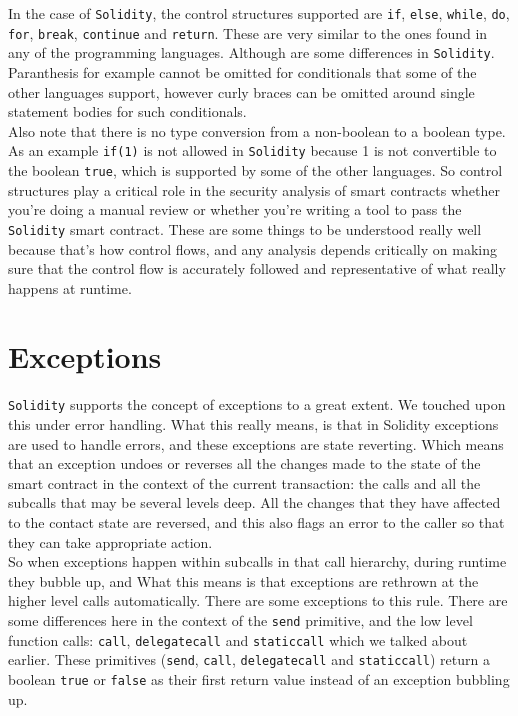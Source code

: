 In the case of \texttt{Solidity}, the control structures supported are \texttt{if}, \texttt{else}, \texttt{while}, \texttt{do}, \texttt{for}, \texttt{break}, \texttt{continue} and \texttt{return}. These are very similar to the ones found in any of the programming languages. Although  are some differences in \texttt{Solidity}. Paranthesis for example cannot be omitted for conditionals that some of the other languages support, however curly braces can be omitted around single statement bodies for such conditionals.\\

Also note that there is no type conversion from a non-boolean to a boolean type. As an example \texttt{if(1)} is not allowed in \texttt{Solidity} because 1 is not convertible to the boolean \texttt{true}, which is supported by some of the other languages. So control structures play a critical role in the security analysis of smart contracts whether you're doing a manual review or whether you're writing a tool to pass the \texttt{Solidity} smart contract. These are some things to be understood really well because that's how control flows, and any analysis depends critically on making sure that the control flow is accurately followed and representative of what really happens at runtime.

\section{Exceptions}
\texttt{Solidity} supports the concept of exceptions to a great extent. We touched upon this under error handling. What this really means, is that in Solidity exceptions are used to handle errors, and these exceptions are state reverting. Which means that an exception undoes or reverses all the changes made to the state of the smart contract in the context of the current transaction: the calls and all the subcalls that may be several levels deep. All the changes that they have affected to the contact state are reversed, and this also flags an error to the caller so that they can take appropriate action.\\

So when exceptions happen within subcalls in that call hierarchy, during runtime they bubble up, and What this means is that exceptions are rethrown at the higher level calls automatically. There are some exceptions to this rule. There are some differences here in the context of the \texttt{send} primitive, and the low level function calls: \texttt{call}, \texttt{delegatecall} and \texttt{staticcall} which we talked about earlier. These primitives (\texttt{send}, \texttt{call}, \texttt{delegatecall} and \texttt{staticcall}) return a boolean \texttt{true} or \texttt{false} as their first return value instead of an exception bubbling up.\\

